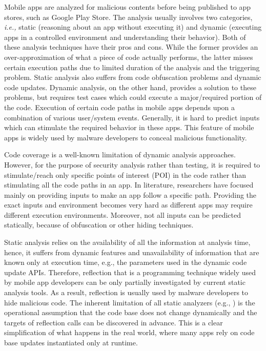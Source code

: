 Mobile apps are analyzed for malicious contents before being published to app stores, such as Google Play Store. The analysis usually involves two categories, \textit{i.e.,} static (reasoning about an app without executing it) and dynamic (executing apps in a controlled environment and understanding their behavior). Both of these analysis techniques have their pros and cons. While the former provides an over-approximation of what a piece of code actually performs, the latter misses certain execution paths due to limited duration of the analysis and the triggering problem. Static analysis also suffers from code obfuscation problems and dynamic code updates. Dynamic analysis, on the other hand, provides a solution to these problems, but requires test cases which could execute a major/required portion of the code.
Execution of certain code paths in mobile apps depends upon a combination of various user/system events. Generally, it is hard to predict inputs which can stimulate the required behavior in these apps. This feature of mobile apps is widely used by malware developers to conceal malicious functionality. 

Code coverage is a well-known limitation of dynamic analysis approaches. However, for the purpose of security analysis rather than testing, it is required to stimulate/reach only specific points of interest (POI) in the code rather than stimulating all the code paths in an app. In literature, researchers have focused mainly on providing inputs to make an app follow a specific path. Providing the exact inputs and environment becomes very hard as different apps may require different execution environments. Moreover, not all inputs can be predicted statically, because of obfuscation or other hiding techniques.

Static analysis relies on the availability of all the information at analysis time, hence, it suffers  from dynamic features and unavailability of information that are known only at execution time, e.g., the parameters used in the dynamic code update APIs. Therefore, reflection that is a programming technique widely used by mobile app developers can be only partially investigated by current  static analysis tools. As a result, reflection is usually used by malware developers to hide malicious code. The inherent limitation of  all static analyzers  (e.g., \cite{FlowDroid_Arzt2014,Saaf_Hoffmann2013}) is the operational assumption  that the code base does not change dynamically and the targets of reflection calls can be discovered in advance. This is a clear simplification of what happens in the real world, where many apps rely on code base updates instantiated only at runtime.


